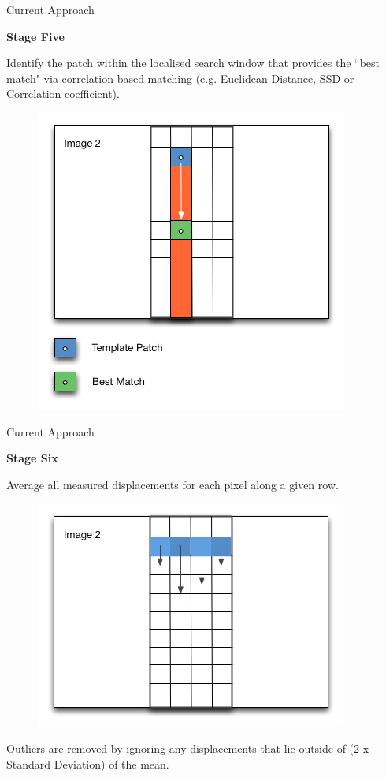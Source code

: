 \documentclass[10pt, compress]{beamer}
\begin{document}
\begin{frame}{Current Approach}

\textbf{Stage Five} \\ \vspace{0.2cm}

Identify the patch within the localised search window that provides the ``best match" via correlation-based matching (e.g. Euclidean Distance, SSD or Correlation coefficient). 

\begin{figure}[ht!]
\centering
\includegraphics[scale=0.35]{stage4.png}
\end{figure}

\end{frame}

\begin{frame}{Current Approach}

\textbf{Stage Six} \\ \vspace{0.2cm}

Average all measured displacements for each pixel along a given row.

\begin{figure}[ht!]
\centering
\includegraphics[scale=0.4]{stage5.png}
\end{figure}

Outliers are removed by ignoring any displacements that lie outside of (2 x Standard Deviation) of the mean.

\end{frame}
\end{document}
